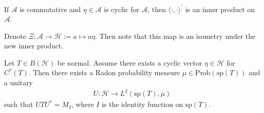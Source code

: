 If $\mathcal{A}$ is commutative and $\eta \in \mathcal{A}$ is cyclic
for $\mathcal{A}$, then $\langle \cdot , \cdot \rangle^\prime$ is an inner
product on $\mathcal{A}$.

Denote $\Xi :  \mathcal{A} \to  \mathcal{H}:= a \mapsto a \eta$. Then
note that this map is an isometry under the new inner product.

\begin{theorem}
  Let $T \in B(\mathcal{H})$ be normal. Assume there exists a cyclic
  vector $\eta \in \mathcal{H}$ for $C^*(T)$. Then there exists a
  Radon probability measure $\mu \in \textrm{Prob}(\textrm{sp}(T))$
  and a unitary
  \begin{align*}
    U: \mathcal{H} \to L^{2}(\textrm{sp}(T), \mu)
  \end{align*}
  such that $UTU^* = M_I$, where $I$ is the identity function on
  $\textrm{sp}(T)$.
\end{theorem}
